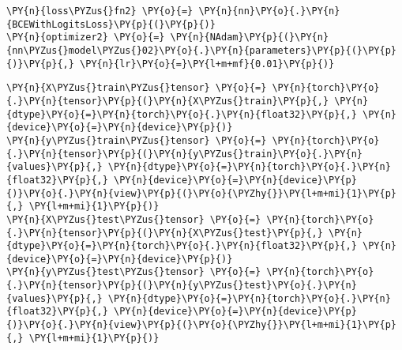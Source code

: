     \begin{tcolorbox}[breakable, size=fbox, boxrule=1pt, pad at break*=1mm,colback=cellbackground, colframe=cellborder]
\begin{Verbatim}[commandchars=\\\{\}]
\PY{n}{loss\PYZus{}fn2} \PY{o}{=} \PY{n}{nn}\PY{o}{.}\PY{n}{BCEWithLogitsLoss}\PY{p}{(}\PY{p}{)}
\PY{n}{optimizer2} \PY{o}{=} \PY{n}{NAdam}\PY{p}{(}\PY{n}{nn\PYZus{}model\PYZus{}02}\PY{o}{.}\PY{n}{parameters}\PY{p}{(}\PY{p}{)}\PY{p}{,} \PY{n}{lr}\PY{o}{=}\PY{l+m+mf}{0.01}\PY{p}{)}
\end{Verbatim}
\end{tcolorbox}

    \begin{tcolorbox}[breakable, size=fbox, boxrule=1pt, pad at break*=1mm,colback=cellbackground, colframe=cellborder]
\begin{Verbatim}[commandchars=\\\{\}]
\PY{n}{X\PYZus{}train\PYZus{}tensor} \PY{o}{=} \PY{n}{torch}\PY{o}{.}\PY{n}{tensor}\PY{p}{(}\PY{n}{X\PYZus{}train}\PY{p}{,} \PY{n}{dtype}\PY{o}{=}\PY{n}{torch}\PY{o}{.}\PY{n}{float32}\PY{p}{,} \PY{n}{device}\PY{o}{=}\PY{n}{device}\PY{p}{)}
\PY{n}{y\PYZus{}train\PYZus{}tensor} \PY{o}{=} \PY{n}{torch}\PY{o}{.}\PY{n}{tensor}\PY{p}{(}\PY{n}{y\PYZus{}train}\PY{o}{.}\PY{n}{values}\PY{p}{,} \PY{n}{dtype}\PY{o}{=}\PY{n}{torch}\PY{o}{.}\PY{n}{float32}\PY{p}{,} \PY{n}{device}\PY{o}{=}\PY{n}{device}\PY{p}{)}\PY{o}{.}\PY{n}{view}\PY{p}{(}\PY{o}{\PYZhy{}}\PY{l+m+mi}{1}\PY{p}{,} \PY{l+m+mi}{1}\PY{p}{)}
\PY{n}{X\PYZus{}test\PYZus{}tensor} \PY{o}{=} \PY{n}{torch}\PY{o}{.}\PY{n}{tensor}\PY{p}{(}\PY{n}{X\PYZus{}test}\PY{p}{,} \PY{n}{dtype}\PY{o}{=}\PY{n}{torch}\PY{o}{.}\PY{n}{float32}\PY{p}{,} \PY{n}{device}\PY{o}{=}\PY{n}{device}\PY{p}{)}
\PY{n}{y\PYZus{}test\PYZus{}tensor} \PY{o}{=} \PY{n}{torch}\PY{o}{.}\PY{n}{tensor}\PY{p}{(}\PY{n}{y\PYZus{}test}\PY{o}{.}\PY{n}{values}\PY{p}{,} \PY{n}{dtype}\PY{o}{=}\PY{n}{torch}\PY{o}{.}\PY{n}{float32}\PY{p}{,} \PY{n}{device}\PY{o}{=}\PY{n}{device}\PY{p}{)}\PY{o}{.}\PY{n}{view}\PY{p}{(}\PY{o}{\PYZhy{}}\PY{l+m+mi}{1}\PY{p}{,} \PY{l+m+mi}{1}\PY{p}{)}
\end{Verbatim}
\end{tcolorbox}

